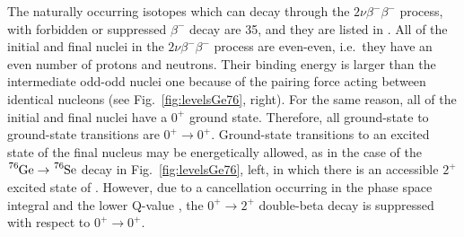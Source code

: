 \marginnote{$2\nu\beta^-\beta^-$} The naturally occurring isotopes which can decay through the $2\nu\beta^-\beta^-$ process, with forbidden or suppressed $\beta^-$ decay are 35, and they are listed in \cite{Giunti:2007ry}. All of the initial and final nuclei in the $2\nu\beta^-\beta^-$ process are even-even, i.e.~they have an even number of protons and neutrons. Their binding energy is larger than the intermediate odd-odd nuclei one because of the pairing force acting between identical nucleons (see Fig.~\ref{fig:levelsGe76}, right). For the same reason, all of the initial and final nuclei have a $0^+$ ground state. Therefore, all ground-state to ground-state transitions are $0^+\rightarrow0^+$. Ground-state transitions to an excited state of the final nucleus may be energetically allowed, as in the case of the $\ce{^{76}Ge}\rightarrow\ce{^{76}Se}$ decay in Fig.~\ref{fig:levelsGe76}, left, in which there is an accessible $2^+$ excited state of . However, due to a cancellation occurring in the phase space integral and the lower Q-value \cite{Tomoda:1991}, the $0^+\rightarrow2^+$ double-beta decay is suppressed with respect to $0^+\rightarrow0^+$.

